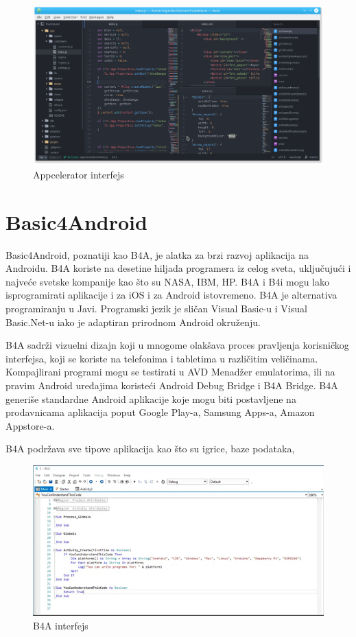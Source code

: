 \documentclass[12pt]{article}
\begin{document}
\begin{figure}[ht!]
    \centering
    \includegraphics[scale=0.3]{Appcelerator.png}
    \caption{Appcelerator interfejs}
\end{figure}

\section{Basic4Android}
Basic4Android, poznatiji kao B4A, je alatka za brzi razvoj aplikacija na Androidu. B4A koriste na desetine hiljada programera iz celog sveta, uključujući i najveće svetske kompanije kao što su NASA, IBM, HP.
B4A i B4i mogu lako isprogramirati aplikacije i za iOS i za Android istovremeno. B4A je alternativa programiranju u Javi. Programski jezik je sličan Visual Basic-u i Visual Basic.Net-u iako je adaptiran prirodnom Android okruženju.

B4A sadrži vizuelni dizajn koji u mnogome olakšava proces pravljenja korisničkog interfejsa, koji se koriste na telefonima i tabletima u različitim veličinama. Kompajlirani programi mogu se testirati u AVD Menadžer emulatorima, ili na pravim Android uređajima koristeći Android Debug Bridge i B4A Bridge. 
B4A generiše standardne Android aplikacije koje mogu biti postavljene na prodavnicama aplikacija poput Google Play-a, Samsung Apps-a, Amazon Appstore-a.

B4A podržava sve tipove aplikacija kao što su igrice, baze podataka, 
\begin{figure}[ht!]
    \centering
    \includegraphics[scale=0.9]{b4aslika.png}
    \caption{B4A interfejs}
\end{figure}
\end{document}

